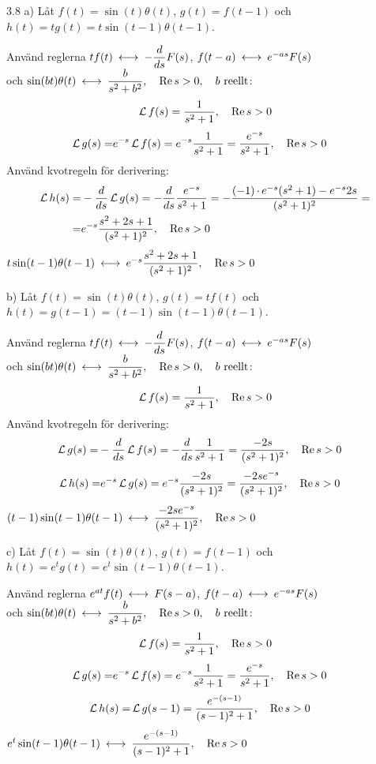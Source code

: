 \begin{task}{3.8 a)}
	Låt $f(t)=\sin(t)\theta(t)$, $g(t)=f(t-1)$ och $h(t)=tg(t)=t\sin(t-1)\theta(t-1)$.
	
	Använd reglerna $tf(t) \llra -\dfrac{d}{ds}F(s)$, $f(t-a)\llra e^{-as}F(s)$ \\
	och $\sin(bt)\theta(t)\llra\dfrac{b}{s^2+b^2}\cond{\Re s > 0}\cond{b\text{ reellt}}$:
	\[\operatorname{\mathcal{L}} f(s)=\frac{1}{s^2+1}, \quad \operatorname{Re} s > 0\]
	\begin{align*}
	\operatorname{\mathcal{L}} g(s)=
	&e^{-s}\operatorname{\mathcal{L}} f(s)=
	e^{-s}\frac{1}{s^2+1}=
	\frac{e^{-s}}{s^2+1}, \quad \operatorname{Re} s > 0
	\end{align*}
	Använd kvotregeln för derivering:
	\begin{align*}
	\operatorname{\mathcal{L}} h(s)=
	&-\frac{d}{ds}\operatorname{\mathcal{L}} g(s)=
	-\frac{d}{ds}\frac{e^{-s}}{s^2+1}=
	-\frac{(-1)\operatorname{\cdot}e^{-s}(s^2+1)-e^{-s}2s}{(s^2+1)^2}= \\ =
	&e^{-s}\frac{s^2+2s+1}{(s^2+1)^2}, \quad \operatorname{Re} s > 0
	\end{align*}
	\ans $t\sin(t-1)\theta(t-1) \llra e^{-s}\dfrac{s^2+2s+1}{(s^2+1)^2}\cond{\Re s > 0}$
\end{task}

\pagebreak
\begin{task}{b)}
	Låt $f(t)=\sin(t)\theta(t)$, $g(t)=tf(t)$ och $h(t)=g(t-1)=(t-1)\sin(t-1)\theta(t-1)$.
	
	Använd reglerna $tf(t) \llra -\dfrac{d}{ds}F(s)$, $f(t-a)\llra e^{-as}F(s)$ \\
	och $\sin(bt)\theta(t)\llra\dfrac{b}{s^2+b^2}\cond{\Re s > 0}\cond{b\text{ reellt}}$:
	\[\operatorname{\mathcal{L}} f(s)=\frac{1}{s^2+1}, \quad \operatorname{Re} s > 0\]
	Använd kvotregeln för derivering:
	\begin{align*}
	\operatorname{\mathcal{L}} g(s)=
	&-\frac{d}{ds}\operatorname{\mathcal{L}} f(s)=
	-\frac{d}{ds}\frac{1}{s^2+1}=
	\frac{-2s}{(s^2+1)^2}, \quad \operatorname{Re} s > 0
	\end{align*}
	\begin{align*}
	\operatorname{\mathcal{L}} h(s)=
	&e^{-s}\operatorname{\mathcal{L}} g(s)=
	e^{-s}\frac{-2s}{(s^2+1)^2}=
	\frac{-2se^{-s}}{(s^2+1)^2}, \quad \operatorname{Re} s > 0
	\end{align*}
	\ans $(t-1)\sin(t-1)\theta(t-1) \llra \dfrac{-2se^{-s}}{(s^2+1)^2}\cond{\Re s > 0}$
\end{task}

\begin{task}{c)}
	Låt $f(t)=\sin(t)\theta(t)$, $g(t)=f(t-1)$ och $h(t)=e^{t}g(t)=e^{t}\sin(t-1)\theta(t-1)$.
	
	Använd reglerna $e^{at}f(t) \llra F(s-a)$, $f(t-a)\llra e^{-as}F(s)$ \\
	och $\sin(bt)\theta(t)\llra\dfrac{b}{s^2+b^2}\cond{\Re s > 0}\cond{b\text{ reellt}}$:
	\[\operatorname{\mathcal{L}} f(s)=\frac{1}{s^2+1}, \quad \operatorname{Re} s > 0\]
	\begin{align*}
	\operatorname{\mathcal{L}} g(s)=
	&e^{-s}\operatorname{\mathcal{L}} f(s)=
	e^{-s}\frac{1}{s^2+1}=
	\frac{e^{-s}}{s^2+1}, \quad \operatorname{Re} s > 0
	\end{align*}
	\begin{align*}
	\operatorname{\mathcal{L}} h(s)=
	&\operatorname{\mathcal{L}} g(s-1)=
	\frac{e^{-(s-1)}}{(s-1)^2+1}, \quad \operatorname{Re} s > 0
	\end{align*}
	\ans $e^{t}\sin(t-1)\theta(t-1) \llra \dfrac{e^{-(s-1)}}{(s-1)^2+1}\cond{\Re s > 0}$
\end{task}


